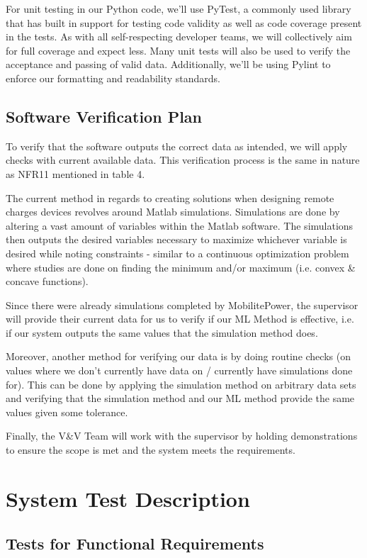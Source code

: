 \documentclass[12pt, titlepage]{article}
\begin{document}
For unit testing in our Python code, we’ll use PyTest, a commonly used library that has built in support for testing code validity as well as code coverage present in the tests. As with all self-respecting developer teams, we will collectively aim for full coverage and expect less. Many unit tests will also be used to verify the acceptance and passing of valid data. Additionally, we'll be using Pylint to enforce our formatting and readability standards.


\subsection{Software Verification Plan}
To verify that the software outputs the correct data as intended, we will apply checks with current available data. This verification process is the same in nature as NFR11 mentioned in table 4. 
\par
The current method in regards to creating solutions when designing remote charges devices revolves around Matlab simulations. Simulations are done by altering a vast amount of variables within the Matlab software. The simulations then outputs the desired variables necessary to maximize whichever variable is desired while noting constraints - similar to a continuous optimization problem where studies are done on finding the minimum and/or maximum (i.e. convex \& concave functions). 
\par
Since there were already simulations completed by MobilitePower, the supervisor will provide their current data for us to verify if our ML Method is effective, i.e. if our system outputs the same values that the simulation method does. 
\par
Moreover, another method for verifying our data is by doing routine checks (on values where we don’t currently have data on / currently have simulations done for). This can be done by applying the simulation method on arbitrary data sets and verifying that the simulation method and our ML method provide the same values given some tolerance. 
\par
Finally, the V\&V Team will work with the supervisor by holding demonstrations to ensure the scope is met and the system meets the requirements.

\section{System Test Description}
\subsection{Tests for Functional Requirements}
\end{document}
